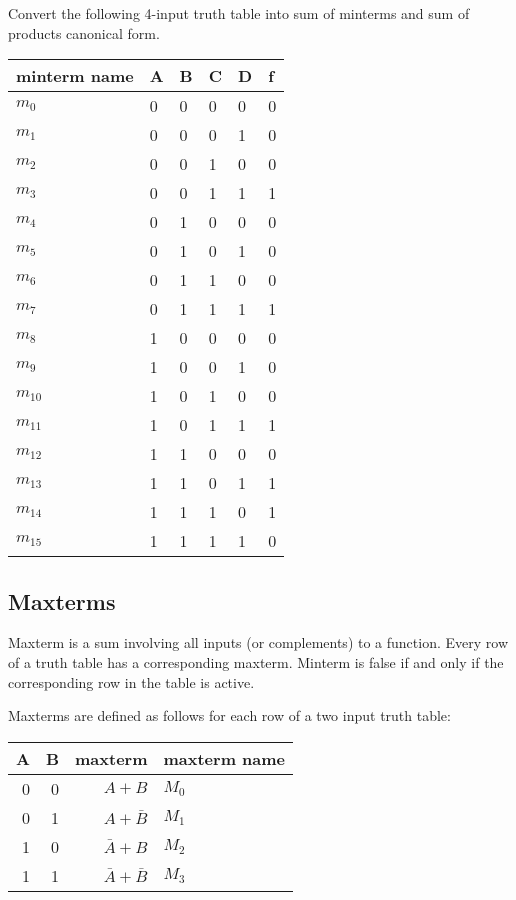 \begin{prob}[10 marks]
  Convert the following 4-input truth table into sum of minterms and sum of products canonical form.

  \noindent
  \begin{tabular}{p{20mm}llll|l}
    \toprule
    minterm name & A & B & C & D & f \\
    \midrule
    $m_0$ & 0 & 0 & 0 & 0 & 0 \\ 
    $m_1$ & 0 & 0 & 0 & 1 & 0 \\ 
    $m_2$ & 0 & 0 & 1 & 0 & 0 \\ 
    $m_3$ & 0 & 0 & 1 & 1 & 1 \\ 
    $m_4$ & 0 & 1 & 0 & 0 & 0 \\ 
    $m_5$ & 0 & 1 & 0 & 1 & 0 \\ 
    $m_6$ & 0 & 1 & 1 & 0 & 0 \\ 
    $m_7$ & 0 & 1 & 1 & 1 & 1 \\ 
    $m_8$ & 1 & 0 & 0 & 0 & 0 \\ 
    $m_9$ & 1 & 0 & 0 & 1 & 0 \\ 
    $m_{10}$ & 1 & 0 & 1 & 0 & 0 \\
    $m_{11}$ & 1 & 0 & 1 & 1 & 1 \\
    $m_{12}$ & 1 & 1 & 0 & 0 & 0 \\
    $m_{13}$ & 1 & 1 & 0 & 1 & 1 \\
    $m_{14}$ & 1 & 1 & 1 & 0 & 1 \\
    $m_{15}$ & 1 & 1 & 1 & 1 & 0 \\
    \bottomrule
  \end{tabular}
\end{prob}


\subsection{Maxterms}
Maxterm is a sum involving all inputs (or complements) to a function.
Every row of a truth table has a corresponding maxterm.
Minterm is false if and only if the corresponding row in the table is active.

Maxterms are defined as follows for each row of a two input truth table:\\
\begin{tabular}{rrrp{20mm}}
  \toprule
  A & B &  maxterm & maxterm name\\
  \midrule
  0 & 0 &  $A + B$ & $M_0$ \\
  0 & 1 &  $A + \bar{B} $ & $M_1$ \\
  1 & 0 &  $\bar{A} + B$ & $M_2$ \\
  1 & 1 &  $\bar{A} + \bar{B} $ & $M_3$ \\
  \bottomrule
\end{tabular}\\[1em]

